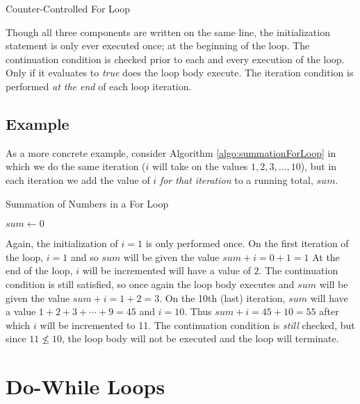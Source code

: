 \begin{algorithm}[h]
\caption{Counter-Controlled For Loop}
\label{algo:counterControlledForLoop}
\end{algorithm}

Though all three components are written on the same line, the initialization statement
is only ever executed once; at the beginning of the loop.  The continuation condition is
checked prior to each and every execution of the loop.  Only if it evaluates to \emph{true}
does the loop body execute.  The iteration condition is performed \emph{at the end} of
each loop iteration.  

\subsection{Example}
\label{subsection:summationExample}

As a more concrete example, consider Algorithm \ref{algo:summationForLoop} in which 
we do the same iteration ($i$ will take on the values $1, 2, 3, \ldots, 10$), but in each 
iteration we add the value of $i$ \emph{for that iteration} to a running total, $sum$.

\begin{algorithm}[h]
\caption{Summation of Numbers in a For Loop}
\label{algo:summationForLoop}
$sum \leftarrow 0$ \;
\end{algorithm}

Again, the initialization of $i = 1$ is only performed once.  On the first iteration of the loop, 
$i = 1$ and so $sum$ will be given the value $sum + i = 0 + 1 = 1$  At the end of the loop, 
$i$ will be incremented will have a value of $2$.  The continuation condition is still satisfied, 
so once again the loop body executes and $sum$ will be given the value $sum + i = 1 + 2 = 3$.
On the 10th (last) iteration, $sum$ will have a value $1 + 2 + 3 + \cdots + 9 = 45$ and $i = 10$.
Thus $sum + i = 45 + 10 = 55$ after which $i$ will be incremented to 11.  The continuation condition
is \emph{still} checked, but since $11 \not\leq 10$, the loop body will not be executed and
the loop will terminate.

\section{Do-While Loops}

